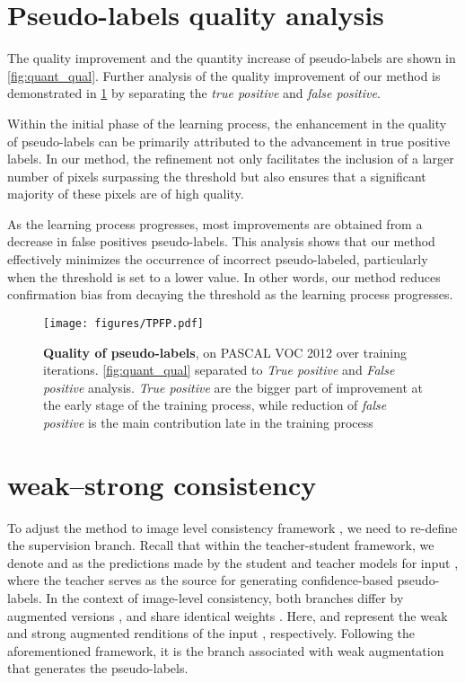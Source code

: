 \documentclass{article}
\renewcommand{\cite}[1]{\citep{#1}}
\begin{document}
\section{Pseudo-labels quality analysis}
\label{sec:quality_analysis}

The quality improvement and the quantity increase of pseudo-labels are shown in \cref{fig:quant_qual}.
Further analysis of the quality improvement of our method is demonstrated in \cref{fig:tpfp} by separating the \textit{true positive} and \textit{false positive}.

Within the initial phase of the learning process, the enhancement in the quality of pseudo-labels can be primarily attributed to the advancement in true positive labels. In our method, the refinement not only facilitates the inclusion of a larger number of pixels surpassing the threshold but also ensures that a significant majority of these pixels are of high quality.

As the learning process progresses, most improvements are obtained from a decrease in false positives pseudo-labels. This analysis shows that our method effectively minimizes the occurrence of incorrect pseudo-labeled, particularly when the threshold is set to a lower value. In other words, our method reduces confirmation bias from decaying the threshold as the learning process progresses.

\begin{figure}[h]
	\centering
	\texttt{[image: figures/TPFP.pdf]} 
	\caption{\textbf{Quality of pseudo-labels}, on PASCAL VOC 2012 \cite{voc} over training iterations. \cref{fig:quant_qual} separated to \textit{True positive} and \textit{False positive} analysis. \textit{True positive} are the bigger part of improvement at the early stage of the training process, while reduction of \textit{false positive} is the main contribution late in the training process}
	\label{fig:tpfp}
\end{figure}

\section{weak--strong consistency}
\label{apdx:weak_strong_consistency}
To adjust the method to image level consistency framework \cite{sohn2020fixmatch,zhang2021flexmatch,wang2023freematch}, we need to re-define the supervision branch. Recall that within the teacher-student framework, we denote  and  as the predictions made by the student and teacher models for input , where the teacher serves as the source for generating confidence-based pseudo-labels. In the context of image-level consistency, both branches differ by augmented versions ,  and  share identical weights . Here,  and  represent the weak and strong augmented renditions of the input , respectively. 
Following the aforementioned framework, it is the branch associated with weak augmentation that generates the pseudo-labels.
\end{document}
